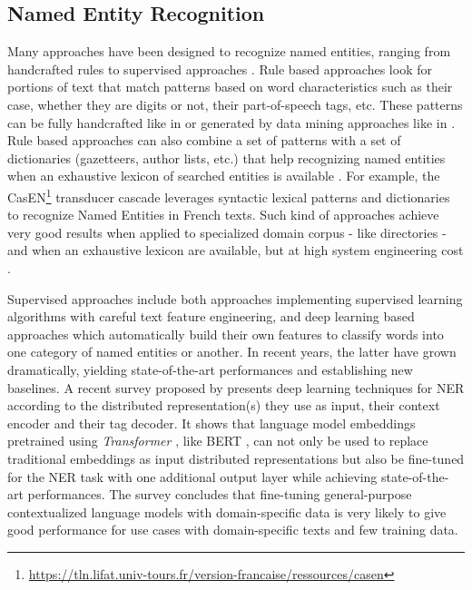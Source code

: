\subsection{Named Entity Recognition}

Many approaches have been designed to recognize named entities, ranging from handcrafted rules to supervised approaches \cite{nadeau2007}.
Rule based approaches look for portions of text that match patterns based on word characteristics such as their case, whether they are digits or not, their part-of-speech tags, etc.
These patterns can be fully handcrafted like in \cite{bell2020automated} or generated by data mining approaches like in \cite{nouvel2011}.
Rule based approaches can also combine a set of patterns with a set of dictionaries (gazetteers, author lists, etc.) that help recognizing named entities when an exhaustive lexicon of searched entities is available \cite{mansouri2008,maurel2011}.
For example, the CasEN\footnote{\url{https://tln.lifat.univ-tours.fr/version-francaise/ressources/casen}} transducer cascade leverages syntactic lexical patterns and dictionaries to recognize Named Entities in French texts.
Such kind of approaches achieve very good results when applied to specialized domain corpus - like directories - and when an exhaustive lexicon are available, but at high system engineering cost \cite{nadeau2007}. 

Supervised approaches include both approaches implementing supervised learning algorithms with careful text feature engineering, and deep learning based approaches which automatically build their own features to classify words into one category of named entities or another.
In recent years, the latter have grown dramatically, yielding state-of-the-art performances and establishing new baselines\cite{li2020}.
A recent survey proposed by \cite{li2020} presents deep learning techniques for NER according to the distributed representation(s) they use as input, their context encoder and their tag decoder.
It shows that language model embeddings pretrained using \textit{Transformer} \cite{vaswani2017attention}, like BERT \cite{devlin2018bert}, can not only be used to replace traditional embeddings as input distributed representations but also be fine-tuned for the NER task with one additional output layer while achieving state-of-the-art performances.
The survey concludes that fine-tuning general-purpose contextualized language models with domain-specific data is very likely to give good performance for use cases with domain-specific texts and few training data.

